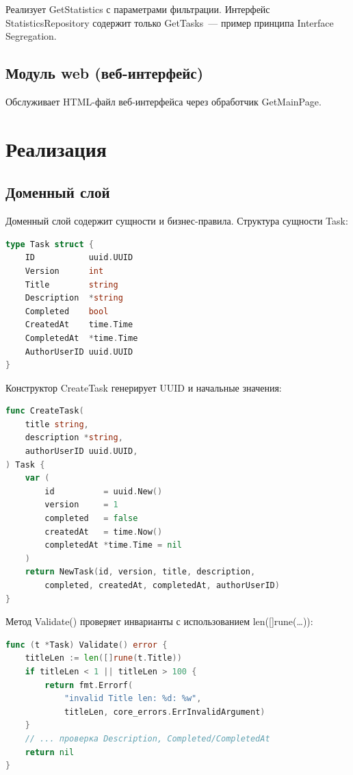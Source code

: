 \documentclass[a4paper,14pt]{extarticle}
\begin{document}
Реализует GetStatistics с параметрами фильтрации. Интерфейс StatisticsRepository содержит только GetTasks~--- пример принципа Interface Segregation.

\subsection{Модуль web (веб-интерфейс)}

Обслуживает HTML-файл веб-интерфейса через обработчик GetMainPage.

\clearpage
\section{Реализация}

\subsection{Доменный слой}

Доменный слой содержит сущности и бизнес-правила. Структура сущности Task:

\begin{lstlisting}[language=Go]
type Task struct {
    ID           uuid.UUID
    Version      int
    Title        string
    Description  *string
    Completed    bool
    CreatedAt    time.Time
    CompletedAt  *time.Time
    AuthorUserID uuid.UUID
}
\end{lstlisting}

Конструктор CreateTask генерирует UUID и начальные значения:

\begin{lstlisting}[language=Go]
func CreateTask(
    title string,
    description *string,
    authorUserID uuid.UUID,
) Task {
    var (
        id          = uuid.New()
        version     = 1
        completed   = false
        createdAt   = time.Now()
        completedAt *time.Time = nil
    )
    return NewTask(id, version, title, description,
        completed, createdAt, completedAt, authorUserID)
}
\end{lstlisting}

Метод Validate() проверяет инварианты с использованием len([]rune(\ldots)):

\begin{lstlisting}[language=Go]
func (t *Task) Validate() error {
    titleLen := len([]rune(t.Title))
    if titleLen < 1 || titleLen > 100 {
        return fmt.Errorf(
            "invalid Title len: %d: %w",
            titleLen, core_errors.ErrInvalidArgument)
    }
    // ... проверка Description, Completed/CompletedAt
    return nil
}
\end{lstlisting}
\end{document}
